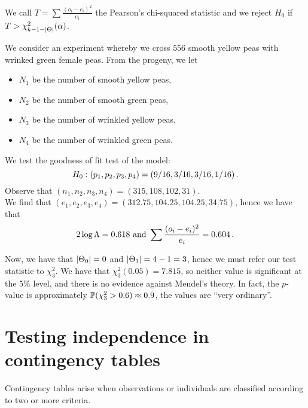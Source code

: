 We call $T = \sum \frac{(o_i - e_i)^2}{e_i}$ the Pearson's chi-squared statistic and we reject $H_0$ if $T > \chi^2_{k-1-\lvert\Theta\rvert}(\alpha)$.

\begin{example}[name=Mendel's peas, label=ex:2.4]
We consider an experiment whereby we cross $556$ smooth yellow peas with wrinked green female peas. From the progeny, we let
\begin{itemize}
\item $N_1$ be the number of smooth yellow peas,
\item $N_2$ be the number of smooth green peas,
\item $N_3$ be the number of wrinkled yellow peas,
\item $N_4$ be the number of wrinkled green peas.
\end{itemize}
We test the goodness of fit test of the model:
\[
H_0 : (p_1, p_2, p_3, p_4) = (9/16, 3/16, 3/16, 1/16) \, {.}
\]
Observe that $(n_1, n_2, n_3, n_4) = (315, 108, 102, 31)$. \\
We find that $(e_1, e_2, e_3, e_4) = (312.75, 104.25, 104.25, 34.75)$, hence we have that
\[
2 \log \Lambda = 0.618 \text{ and } \sum \frac{(o_i - e_i)^2}{e_i} = 0.604 \, {.}
\]

Now, we have that $\lvert\Theta_0\rvert = 0$ and $\lvert\Theta_1\rvert = 4 - 1 = 3$, hence we must refer our test statistic to $\chi^2_3$.
We have that $\chi^2_3 (0.05) = 7.815$, so neither value is significant at the $5\%$ level, and there is no evidence against Mendel's theory.
In fact, the $p$-value is approximately $\mathbb{P}(\chi^2_3 > 0.6) \approx 0.9$, the values are ``very ordinary''.
\end{example}

\section{Testing independence in contingency tables\label{sec:2.6}}
Contingency tables arise when observations or individuals are classified according to two or more criteria.

